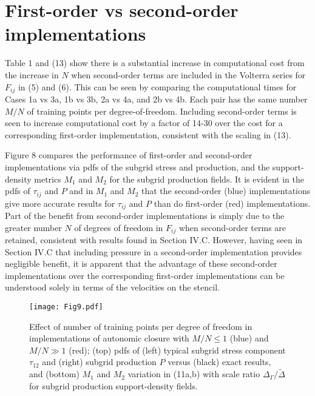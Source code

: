\section{First-order vs second-order implementations}

Table 1 and (13) show there is a substantial increase in computational cost from the increase in $N$ when second-order terms are included in the Volterra series for  $F_{ij}$ in (5) and (6). This can be seen by comparing the computational times for Cases 1a vs 3a, 1b vs 3b, 2a vs 4a, and 2b vs 4b. Each pair has the same number  $M/N$ of training points per degree-of-freedom. Including second-order terms is seen to increase computational cost by a factor of 14-30 over the cost for a corresponding first-order implementation, consistent with the scaling in (13).  

Figure 8 compares the performance of first-order and second-order implementations via pdfs of the subgrid stress and production, and the support-density metrics  $M_1$ and $M_2$ for the subgrid production fields. It is evident in the pdfs of  $\tau_{ij}$ and $P$ and in $M_1$   and $M_2$  that the second-order (blue) implementations give more accurate results for  $\tau_{ij}$ and $P$ than do first-order (red) implementations. Part of the benefit from second-order implementations is simply due to the greater number $N$ of degrees of freedom in  $F_{ij}$ when second-order terms are retained, consistent with results found in Section IV.C. However, having seen in Section IV.C that including pressure in a second-order implementation provides negligible benefit, it is apparent that the advantage of these second-order implementations over the corresponding first-order implementations can be understood solely in terms of the velocities on the stencil. 

%
\begin{figure}
	\begin{center}
	\texttt{[image: Fig9.pdf]}
	\caption{Effect of number of training points per degree of freedom in implementations of autonomic closure with $M/N \leq 1$ (blue) and $M/N \gg 1$  (red); (top) pdfs of (left) typical subgrid stress component $\tau_{12}$ and (right) subgrid production $P$ versus (black) exact results, and (bottom) $M_1$ and $M_2$ variation in (11a,b) with scale ratio $\Delta_{\Gamma}/\widetilde{\Delta}$ for subgrid production support-density fields.}
	\label{F:9}
	\end{center}
\end{figure}
%
%

